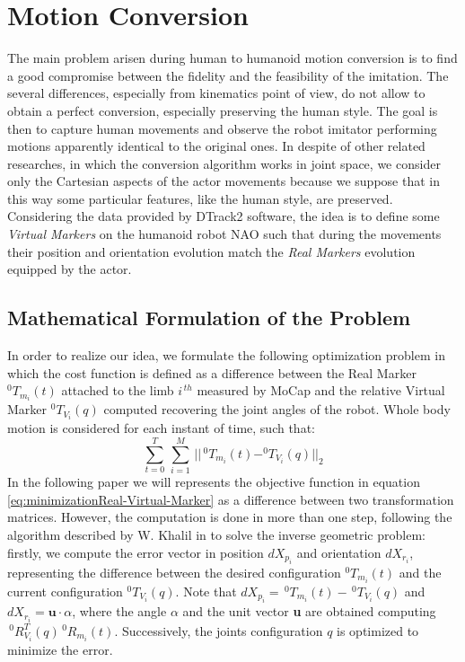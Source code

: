 \documentclass[a4paper, 10pt, conference]{ieeeconf}
\begin{document}
\section{Motion Conversion}
The main problem arisen during human to humanoid motion conversion is to find a good compromise between the fidelity and the feasibility of the imitation. The several differences, especially from kinematics point of view, do not allow to obtain a perfect conversion, especially preserving the human style.
The goal is then to capture human movements and observe the robot imitator performing motions apparently identical to the original ones.
In despite of other related researches, in which the conversion algorithm works in joint space, we consider only the Cartesian aspects of the actor movements because we suppose that in this way some particular features, like the human style, are preserved.
Considering the data provided by DTrack2 software, the idea is to define some \textit{Virtual Markers} on the humanoid robot NAO such that during the movements their position and orientation evolution match the \textit{Real Markers} evolution equipped by the actor.
\subsection{Mathematical Formulation of the Problem}
In order to realize our idea, we formulate the following optimization problem in which the cost function is defined as a difference between the Real Marker $\mathit{^{0}T_{m_i}}(t)$ attached to the limb $i^{\,th}$ measured by MoCap and the relative Virtual Marker $\mathit{^{0}T_{V_i}}(q)$ computed recovering the joint angles of the robot. Whole body motion is considered for each instant of time, such that:
\begin{equation}
\sum^{T}_{t=0} \, \sum^{M}_{i=1} \, || \, ^{0}T_{m_i}(t) - ^{0}T_{V_i}(q) ||_2
\label{eq:minimizationReal-Virtual-Marker}
\end{equation}
In the following paper we will represents the objective function in equation \eqref{eq:minimizationReal-Virtual-Marker} as a difference between two transformation matrices.
However, the computation is done in more than one step, following the algorithm described by W. Khalil in \cite{Khalil2002} to solve the inverse geometric problem: firstly, we compute the error vector in position $\mathit{dX_{p_i}}$ and orientation ${\mathit{dX_{r_i}}}$, representing the difference between the desired configuration $^{0}T_{m_i}(t)$ and the current configuration $^{0}T_{V_i}(q)$. Note that $\mathit{dX_{p_i}} =\, ^{0}T_{m_i}(t) - \, ^{0}T_{V_i}(q)$ and ${dX_{r_i}} = \mathbf{u} \cdot \alpha$, where the angle $\alpha$ and the unit vector \textbf{u} are obtained computing $\,^{0}R^T_{V_i}(q) \,^{0}R_{m_i}(t)$.
Successively, the joints configuration $q$ is optimized to minimize the error.
\end{document}
